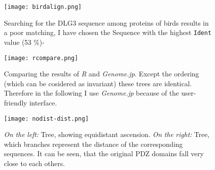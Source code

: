 \begin{figure}
\centering
\texttt{[image: birdalign.png]}
\caption{Searching for the DLG3 sequence among proteins of birds results in a poor matching, I have chosen the Sequence with the highest \texttt{Ident} value (53 \%)-}
\label{bird}
\end{figure}

\begin{figure}
\centering
\texttt{[image: rcompare.png]}
\caption{Comparing the results of \emph{R} and \emph{Genome.jp}. Except the ordering (which can be cosidered as invariant) these trees are identical. Therefore in the following I use \emph{Genome.jp} because of the user-friendly interface.}
\label{comapre1}
\end{figure}

\begin{figure}
\centering
\texttt{[image: nodist-dist.png]}
\caption{\emph{On the left:} Tree, showing equidistant ascension. \emph{On the right:} Tree, which branches represent the distance of the corresponding sequences. It can be seen, that the original PDZ domains fall very close to each others.}
\label{comapre2}
\end{figure}

